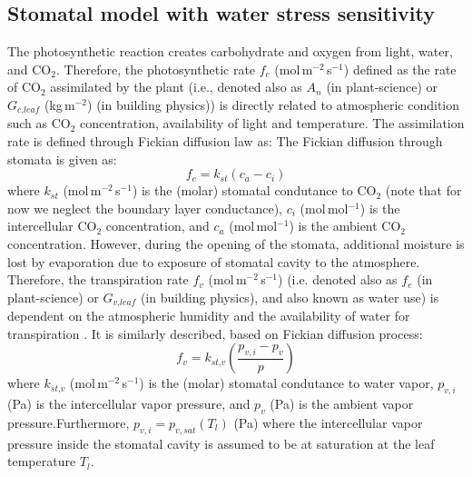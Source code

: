 \subsection{Stomatal model with water stress sensitivity}
\label{subsec:sm}
	
The photosynthetic reaction creates carbohydrate and oxygen from light, water, and CO$_2$. Therefore, the photosynthetic rate $f_c$ (mol\,m$^{-2}$\,s$^{-1}$) defined as the rate of CO$_2$ assimilated by the plant (i.e., denoted also as $A_n$ (in plant-science) or $G_{\textit{c,leaf}}$ (kg\,m$^{-2}$) (in building physics)) is directly related to atmospheric condition such as CO$_2$ concentration, availability of light and temperature. The assimilation rate is defined through Fickian diffusion law as:
The Fickian diffusion through stomata is given as:
\begin{equation}
f_c = k_{\textit{st}} \left(c_a - c_i\right)
\label{eq:fickassim}
\end{equation}
where $k_{st}$ (mol\,m$^{-2}$\,s$^{-1}$) is the (molar) stomatal condutance to CO$_2$ (note that for now we neglect the boundary layer conductance), $c_i$ (mol\,mol$^{-1}$) is the intercellular CO$_2$ concentration, and $c_a$ (mol\,mol$^{-1}$) is the ambient CO$_2$ concentration. However, during the opening of the stomata, additional moisture is lost by evaporation due to exposure of stomatal cavity to the atmosphere. Therefore, the transpiration rate $f_v$ (mol\,m$^{-2}$\,s$^{-1}$) (i.e. denoted also as $f_e$ (in plant-science) or $G_{\textit{v,leaf}}$ (in building physics), and also known as water use) is dependent on the atmospheric humidity and the availability of water for transpiration \citep{Ball1987,Leuning1995}. It is similarly described, based on Fickian diffusion process:
\begin{equation}
f_v = k_{\textit{st,v}} \left(\frac{p_{v,i} - p_v}{p}\right)
\label{eq:fv}
\end{equation}
where $k_{\textit{st,v}}$ (mol\,m$^{-2}$\,s$^{-1}$) is the (molar) stomatal condutance to water vapor, $p_{v,i}$ (Pa) is the intercellular vapor pressure, and $p_v$ (Pa) is the ambient vapor pressure.Furthermore, $p_{v,i} = p_{v,sat}\left(T_l\right)$ (Pa) where the intercellular vapor pressure inside the stomatal cavity is assumed to be at saturation at the leaf temperature $T_l$. 


